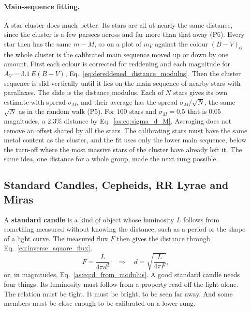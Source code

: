 \paragraph{Main-sequence fitting.} A star cluster does much better. Its stars are all at nearly the same distance, since the cluster is a few parsecs across and far more than that away (P6). Every star then has the same $m-M$, so on a plot of $m_V$ against the colour $(B-V)_0$ the whole cluster is the calibrated main sequence moved up or down by one amount. First each colour is corrected for reddening and each magnitude for $A_V=3.1\,E(B-V)$, Eq.~\eqref{eq:dereddened_distance_modulus}. Then the cluster sequence is slid vertically until it lies on the main sequence of nearby stars with parallaxes. The slide is the distance modulus. Each of $N$ stars gives its own estimate with spread $\sigma_M$, and their average has the spread $\sigma_M/\sqrt N$, the same $\sqrt N$ as in the random walk (P5). For $100$ stars and $\sigma_M=0.5$ that is $0.05$ magnitudes, a $2.3\%$ distance by Eq.~\eqref{as:eq:sigma_d_M}. Averaging does not remove an offset shared by all the stars. The calibrating stars must have the same metal content as the cluster, and the fit uses only the lower main sequence, below the turn-off where the most massive stars of the cluster have already left it. The same idea, one distance for a whole group, made the next rung possible.

\subsection{Standard Candles, Cepheids, RR Lyrae and Miras}
\label{as:sec:candles}

A \textbf{standard candle} is a kind of object whose luminosity $L$ follows from something measured without knowing the distance, such as a period or the shape of a light curve. The measured flux $F$ then gives the distance through Eq.~\eqref{eq:inverse_square_flux},
\begin{equation}
	F=\frac{L}{4\pi d^2}
	\quad\Longrightarrow\quad
	d=\sqrt{\frac{L}{4\pi F}} ,
	\label{as:eq:d_candle}
\end{equation}
or, in magnitudes, Eq.~\eqref{as:eq:d_from_modulus}. A good standard candle needs four things. Its luminosity must follow from a property read off the light alone. The relation must be tight. It must be bright, to be seen far away. And some members must be close enough to be calibrated on a lower rung.

